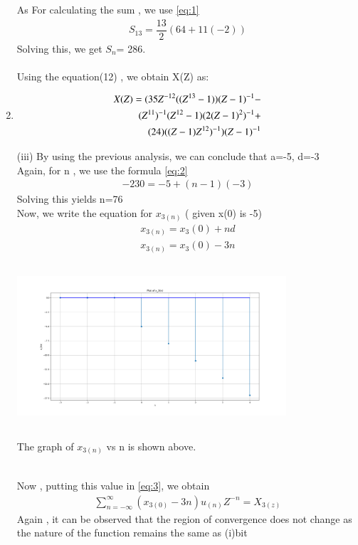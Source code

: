 \documentclass[journal,12pt,twocolumn]{IEEEtran}
\theoremstyle{remark}
\begin{document}
\begin{enumerate}
As For calculating the sum , we use \eqref{eq:1}
\begin{align}
 S_{13} = \dfrac{13}{2}(64+11(-2))
 \end{align}
 Solving this, we get $S_n$= 286.\\\\
 Using the equation(12) , we obtain X(Z) as:\\
  \item 
  \begin{align}      
  \notag X(Z)= (35Z^{-12}((Z^{13}-1))(Z-1)^{-1}-\\
  \notag (Z^{11})^{-1}(Z^{12}-1)(2(Z-1)^{2})^{-1}+\\
  \notag (24)((Z-1)Z^{12})^{-1})(Z-1)^{-1}
    \end{align}


\item[(iii)]  
\vspace{0.5cm}
By using the previous analysis, we can conclude that a=-5, d=-3\\
Again, for n , we use the formula \eqref{eq:2}
\begin{align}
-230= -5+(n-1)(-3)
\end{align}
Solving this yields n=76\\
Now, we write the equation for $x_{3(n)}$ ( given x(0) is -5)
\begin{align}
x_{3(n)} = x_3{(0)} + nd\\
x_{3(n)}=x_3{(0)} - 3n
\end{align}
\graphicspath{ {figs/} }
\includegraphics[width=10cm, height=6cm]{graph_3}
\caption{The graph of $x_{3(n)}$ vs n is shown above.}\\
\label{graph:4}
Now , putting this value in \eqref{eq:3}, we obtain\\
\begin{align}
\sum_{n=-\infty}^{\infty}(x_{3(0)} -3n)u_{(n)}Z^{-n} =X_{3(z)}
\end{align}
Again , it can be observed that the region of convergence does not change as the nature of the function remains the same as (i)bit\\

\end{enumerate}
\end{document}

